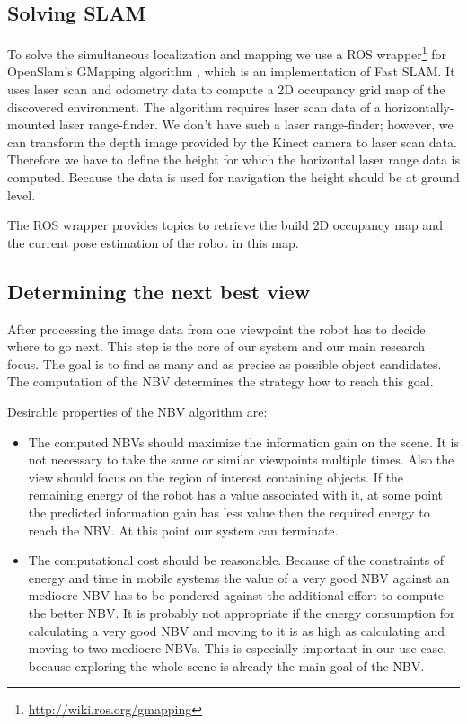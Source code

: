 \documentclass[a4paper,11pt,english]{article}
\begin{document}
\subsection{Solving SLAM}
\label{system:slam}
To solve the simultaneous localization and mapping we use a ROS wrapper\footnote{\url{http://wiki.ros.org/gmapping}} for OpenSlam's GMapping algorithm \cite{grisetti2007}, which is an implementation of Fast SLAM.
It uses laser scan and odometry data to compute a 2D occupancy grid map of the discovered environment.
The algorithm requires laser scan data of a horizontally-mounted laser range-finder.
We don't have such a laser range-finder; however, we can transform the depth image provided by the Kinect camera to laser scan data.
Therefore we have to define the height for which the horizontal laser range data is computed.
Because the data is used for navigation the height should be at ground level.

The ROS wrapper provides topics to retrieve the build 2D occupancy map and the current pose estimation of the robot in this map.




\subsection{Determining the next best view}
\label{system:nbv}
After processing the image data from one viewpoint the robot has to decide where to go next.
This step is the core of our system and our main research focus.
The goal is to find as many and as precise as possible object candidates.
The computation of the NBV determines the strategy how to reach this goal.

Desirable properties of the NBV algorithm are:
\begin{itemize}
	\item The computed NBVs should maximize the information gain on the scene. It is not necessary to take the same or similar viewpoints multiple times. Also the view should focus on the region of interest containing objects. If the remaining energy of the robot has a value associated with it, at some point the predicted information gain has less value then the required energy to reach the NBV. At this point our system can terminate.
	\item The computational cost should be reasonable. Because of the constraints of energy and time in mobile systems the value of a very good NBV against an mediocre NBV has to be pondered against the additional effort to compute the better NBV. It is probably not appropriate if the energy consumption for calculating a very good NBV and moving to it is as high as calculating and moving to two mediocre NBVs. This is especially important in our use case, because exploring the whole scene is already the main goal of the NBV.
\end{itemize}
\end{document}
